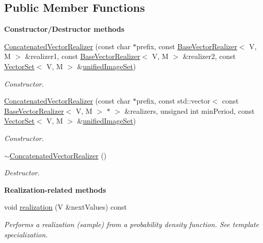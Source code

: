 \subsection*{Public Member Functions}
\begin{Indent}{\bf Constructor/\-Destructor methods}\par
\begin{DoxyCompactItemize}
\item 
\hyperlink{class_q_u_e_s_o_1_1_concatenated_vector_realizer_a8a97c764739721d97851285e69b9739a}{Concatenated\-Vector\-Realizer} (const char $\ast$prefix, const \hyperlink{class_q_u_e_s_o_1_1_base_vector_realizer}{Base\-Vector\-Realizer}$<$ V, M $>$ \&realizer1, const \hyperlink{class_q_u_e_s_o_1_1_base_vector_realizer}{Base\-Vector\-Realizer}$<$ V, M $>$ \&realizer2, const \hyperlink{class_q_u_e_s_o_1_1_vector_set}{Vector\-Set}$<$ V, M $>$ \&\hyperlink{class_q_u_e_s_o_1_1_base_vector_realizer_ad958991bab8d6369e8a0d66b22a237d4}{unified\-Image\-Set})
\begin{DoxyCompactList}\small\item\em Constructor. \end{DoxyCompactList}\item 
\hyperlink{class_q_u_e_s_o_1_1_concatenated_vector_realizer_afc7fe7165243f12a2da43f78ee67ef5c}{Concatenated\-Vector\-Realizer} (const char $\ast$prefix, const std\-::vector$<$ const \hyperlink{class_q_u_e_s_o_1_1_base_vector_realizer}{Base\-Vector\-Realizer}$<$ V, M $>$ $\ast$ $>$ \&realizers, unsigned int min\-Period, const \hyperlink{class_q_u_e_s_o_1_1_vector_set}{Vector\-Set}$<$ V, M $>$ \&\hyperlink{class_q_u_e_s_o_1_1_base_vector_realizer_ad958991bab8d6369e8a0d66b22a237d4}{unified\-Image\-Set})
\begin{DoxyCompactList}\small\item\em Constructor. \end{DoxyCompactList}\item 
\hyperlink{class_q_u_e_s_o_1_1_concatenated_vector_realizer_a661c37a3cd05a88d98ba95cc2780bb81}{$\sim$\-Concatenated\-Vector\-Realizer} ()
\begin{DoxyCompactList}\small\item\em Destructor. \end{DoxyCompactList}\end{DoxyCompactItemize}
\end{Indent}
\begin{Indent}{\bf Realization-\/related methods}\par
\begin{DoxyCompactItemize}
\item 
void \hyperlink{class_q_u_e_s_o_1_1_concatenated_vector_realizer_afa41c8065e84a5bbfd74a67436ecd889}{realization} (V \&next\-Values) const 
\begin{DoxyCompactList}\small\item\em Performs a realization (sample) from a probability density function. See template specialization. \end{DoxyCompactList}\end{DoxyCompactItemize}
\end{Indent}
